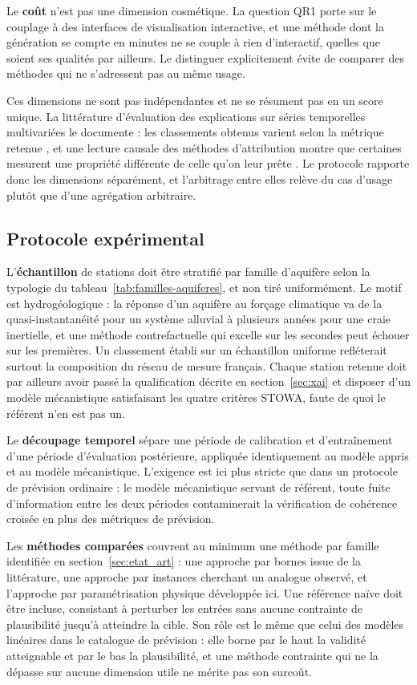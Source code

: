 Le \textbf{coût} n'est pas une dimension cosmétique. La question QR1 porte sur le couplage à des interfaces de visualisation interactive, et une méthode dont la génération se compte en minutes ne se couple à rien d'interactif, quelles que soient ses qualités par ailleurs. Le distinguer explicitement évite de comparer des méthodes qui ne s'adressent pas au même usage.

Ces dimensions ne sont pas indépendantes et ne se résument pas en un score unique. La littérature d'évaluation des explications sur séries temporelles multivariées le documente : les classements obtenus varient selon la métrique retenue \cite{serramazza2023evaluating}, et une lecture causale des méthodes d'attribution montre que certaines mesurent une propriété différente de celle qu'on leur prête \cite{vareille2023evaluating}. Le protocole rapporte donc les dimensions séparément, et l'arbitrage entre elles relève du cas d'usage plutôt que d'une agrégation arbitraire.

\subsection{Protocole expérimental}

L'\textbf{échantillon} de stations doit être stratifié par famille d'aquifère selon la typologie du tableau~\ref{tab:familles-aquiferes}, et non tiré uniformément. Le motif est hydrogéologique : la réponse d'un aquifère au forçage climatique va de la quasi-instantanéité pour un système alluvial à plusieurs années pour une craie inertielle, et une méthode contrefactuelle qui excelle sur les secondes peut échouer sur les premières. Un classement établi sur un échantillon uniforme refléterait surtout la composition du réseau de mesure français. Chaque station retenue doit par ailleurs avoir passé la qualification décrite en section~\ref{sec:xai} et disposer d'un modèle mécanistique satisfaisant les quatre critères STOWA, faute de quoi le référent n'en est pas un.

Le \textbf{découpage temporel} sépare une période de calibration et d'entraînement d'une période d'évaluation postérieure, appliquée identiquement au modèle appris et au modèle mécanistique. L'exigence est ici plus stricte que dans un protocole de prévision ordinaire : le modèle mécanistique servant de référent, toute fuite d'information entre les deux périodes contaminerait la vérification de cohérence croisée en plus des métriques de prévision.

Les \textbf{méthodes comparées} couvrent au minimum une méthode par famille identifiée en section~\ref{sec:etat_art} : une approche par bornes issue de la littérature, une approche par instances cherchant un analogue observé, et l'approche par paramétrisation physique développée ici. Une référence naïve doit être incluse, consistant à perturber les entrées sans aucune contrainte de plausibilité jusqu'à atteindre la cible. Son rôle est le même que celui des modèles linéaires dans le catalogue de prévision : elle borne par le haut la validité atteignable et par le bas la plausibilité, et une méthode contrainte qui ne la dépasse sur aucune dimension utile ne mérite pas son surcoût.


